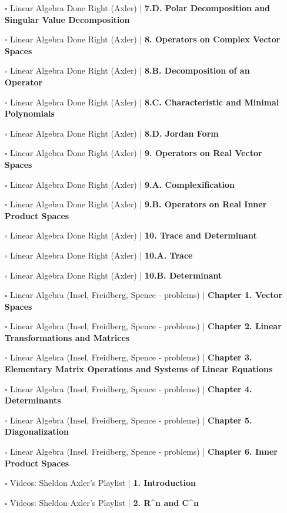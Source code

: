 \documentclass[a4, landscape, 12pt]{article}
\newcommand{\checkbox}{$\square$}%
\begin{document}
\begin{itemize}
{}
\item [\checkbox] Linear Algebra Done Right (Axler)  | \textbf{7.D. Polar Decomposition and Singular Value Decomposition
}
\item [\checkbox] Linear Algebra Done Right (Axler)  | \textbf{8. Operators on Complex Vector Spaces
}
\item [\checkbox] Linear Algebra Done Right (Axler)  | \textbf{8.B. Decomposition of an Operator
}
\item [\checkbox] Linear Algebra Done Right (Axler)  | \textbf{8.C. Characteristic and Minimal Polynomials
}
\item [\checkbox] Linear Algebra Done Right (Axler)  | \textbf{8.D. Jordan Form
}
\item [\checkbox] Linear Algebra Done Right (Axler)  | \textbf{9. Operators on Real Vector Spaces
}
\item [\checkbox] Linear Algebra Done Right (Axler)  | \textbf{9.A. Complexification
}
\item [\checkbox] Linear Algebra Done Right (Axler)  | \textbf{9.B. Operators on Real Inner Product Spaces
}
\item [\checkbox] Linear Algebra Done Right (Axler)  | \textbf{10. Trace and Determinant
}
\item [\checkbox] Linear Algebra Done Right (Axler)  | \textbf{10.A. Trace
}
\item [\checkbox] Linear Algebra Done Right (Axler)  | \textbf{10.B. Determinant
}
\item [\checkbox] Linear Algebra (Insel, Freidberg, Spence - problems)  | \textbf{Chapter 1. Vector Spaces
}
\item [\checkbox] Linear Algebra (Insel, Freidberg, Spence - problems)  | \textbf{Chapter 2. Linear Transformations and Matrices
}
\item [\checkbox] Linear Algebra (Insel, Freidberg, Spence - problems)  | \textbf{Chapter 3. Elementary Matrix Operations and Systems of Linear Equations
}
\item [\checkbox] Linear Algebra (Insel, Freidberg, Spence - problems)  | \textbf{Chapter 4. Determinants
}
\item [\checkbox] Linear Algebra (Insel, Freidberg, Spence - problems)  | \textbf{Chapter 5. Diagonalization
}
\item [\checkbox] Linear Algebra (Insel, Freidberg, Spence - problems)  | \textbf{Chapter 6. Inner Product Spaces
}
\item [\checkbox] Videos: Sheldon Axler’s Playlist  | \textbf{1. Introduction
}
\item [\checkbox] Videos: Sheldon Axler’s Playlist  | \textbf{2. R^n and C^n
}
\end{itemize}
\end{document}

